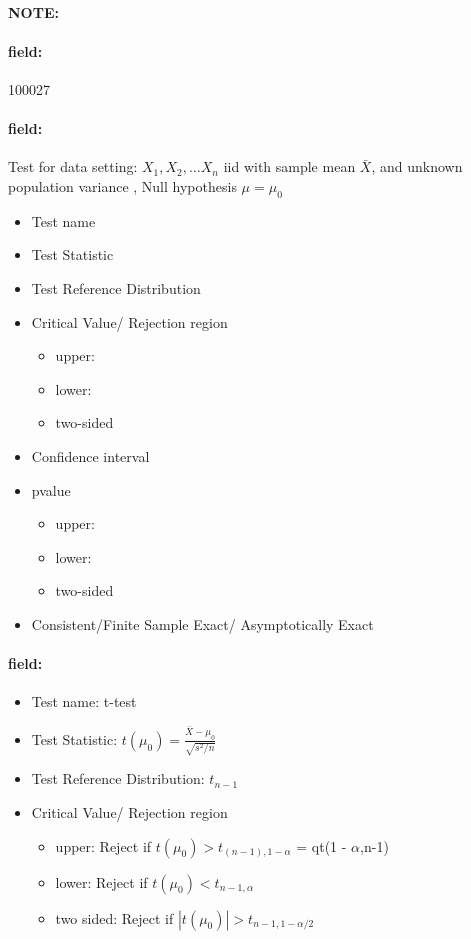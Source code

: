 \documentclass[12pt]{article}
\newenvironment{note}{\paragraph{NOTE:}}{}
\newenvironment{field}{\paragraph{field:}}{}
\begin{document}
\begin{note} \begin{field} \tiny 100027 \end{field}
 \begin{field}
  Test for data setting: $X_1, X_2, \ldots X_n$ iid with sample mean $\bar{X}$, and unknown population variance , Null hypothesis $\mu = \mu_0$
  \begin{itemize}
   \item Test name
   \item Test Statistic
   \item Test Reference Distribution
   \item Critical Value/ Rejection region
         \begin{itemize}
          \item upper:
          \item lower:
          \item two-sided
         \end{itemize}
   \item Confidence interval
   \item pvalue
         \begin{itemize}
          \item upper:
          \item lower:
          \item two-sided
         \end{itemize}
   \item Consistent/Finite Sample Exact/ Asymptotically Exact
  \end{itemize}
 \end{field}
 \begin{field}
  \begin{itemize}
   \item Test name: t-test
   \item Test Statistic: $t(\mu_0) = \frac{\bar{X} - \mu_0}{\sqrt{s^2/n}}$
   \item Test Reference Distribution: $t_{n-1}$
   \item Critical Value/ Rejection region
         \begin{itemize}
          \item upper: Reject if $t(\mu_0) > t_{(n-1),1-\alpha}$ = qt(1 - $\alpha$,n-1)
          \item lower: Reject if $t(\mu_0)  < t_{n-1,\alpha}$
          \item two sided: Reject if $|t(\mu_0)| > t_{n-1, 1 - \alpha/2}$
         \end{itemize}

\end{itemize}
\end{field}
\end{note}
\end{document}
